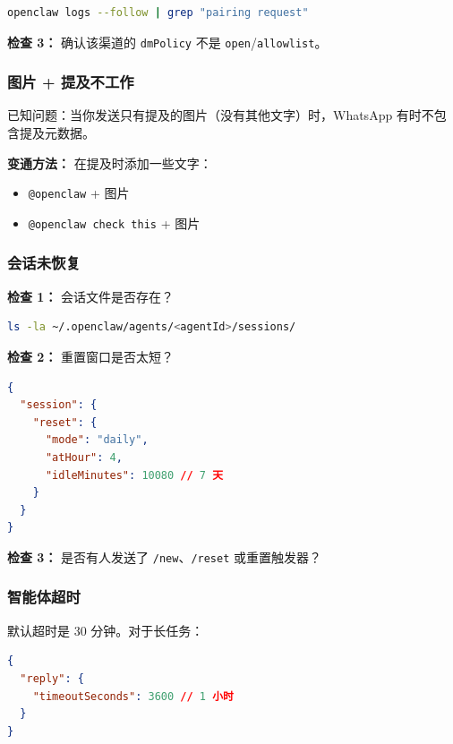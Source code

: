 \begin{lstlisting}[language=bash]
openclaw logs --follow | grep "pairing request"
\end{lstlisting}


\textbf{检查 3：} 确认该渠道的 \texttt{dmPolicy} 不是 \texttt{open}/\texttt{allowlist}。

\subsubsection{图片 + 提及不工作}


已知问题：当你发送只有提及的图片（没有其他文字）时，WhatsApp 有时不包含提及元数据。

\textbf{变通方法：} 在提及时添加一些文字：

\begin{itemize}
  \item {} \texttt{@openclaw} + 图片
  \item {} \texttt{@openclaw check this} + 图片
\end{itemize}


\subsubsection{会话未恢复}


\textbf{检查 1：} 会话文件是否存在？

\begin{lstlisting}[language=bash]
ls -la ~/.openclaw/agents/<agentId>/sessions/
\end{lstlisting}


\textbf{检查 2：} 重置窗口是否太短？

\begin{lstlisting}[language=json]
{
  "session": {
    "reset": {
      "mode": "daily",
      "atHour": 4,
      "idleMinutes": 10080 // 7 天
    }
  }
}
\end{lstlisting}


\textbf{检查 3：} 是否有人发送了 \texttt{/new}、\texttt{/reset} 或重置触发器？

\subsubsection{智能体超时}


默认超时是 30 分钟。对于长任务：

\begin{lstlisting}[language=json]
{
  "reply": {
    "timeoutSeconds": 3600 // 1 小时
  }
}
\end{lstlisting}


